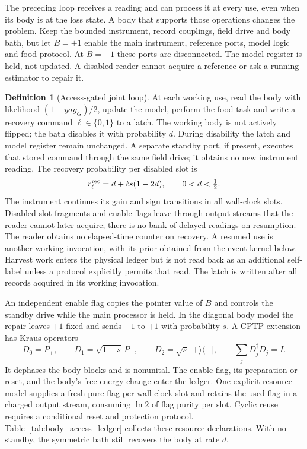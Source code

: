 \documentclass[12pt]{article}
\theoremstyle{definition}
\newtheorem{definition}[theorem]{Definition}
\begin{document}
The preceding loop receives a reading and can process it at every use, even when its body is at the loss state. A body that supports those operations changes the problem. Keep the bounded instrument, record couplings, field drive and body bath, but let $B=+1$ enable the main instrument, reference ports, model logic and food protocol. At $B=-1$ these ports are disconnected. The model register is held, not updated. A disabled reader cannot acquire a reference or ask a running estimator to repair it.

\begin{definition}[Access-gated joint loop]
\label{def:access_joint}
At each working use, read the body with likelihood $(1+y\sigma g_G)/2$, update the model, perform the food task and write a recovery command $\ell\in\{0,1\}$ to a latch. The working body is not actively flipped; the bath disables it with probability $d$. During disability the latch and model register remain unchanged. A separate standby port, if present, executes that stored command through the same field drive; it obtains no new instrument reading. The recovery probability per disabled slot is
\[
 r^{\rm rec}_\ell=d+\ell s(1-2d),\qquad 0<d<\tfrac12.
\]
The instrument continues its gain and sign transitions in all wall-clock slots. Disabled-slot fragments and enable flags leave through output streams that the reader cannot later acquire; there is no bank of delayed readings on resumption. The reader obtains no elapsed-time counter on recovery. A resumed use is another working invocation, with its prior obtained from the event kernel below.
Harvest work enters the physical ledger but is not read back as an additional self-label unless a protocol explicitly permits that read. The latch is written after all records acquired in its working invocation.
\end{definition}

An independent enable flag copies the pointer value of $B$ and controls the standby drive while the main processor is held. In the diagonal body model the repair leaves $+1$ fixed and sends $-1$ to $+1$ with probability $s$. A CPTP extension has Kraus operators
\[
 D_0=P_+,\qquad D_1=\sqrt{1-s}\,P_-,\qquad
 D_2=\sqrt{s}\,\lvert+\rangle\langle-\rvert,
 \qquad \sum_jD_j^\dagger D_j=I.
\]
It dephases the body blocks and is nonunital. The enable flag, its preparation or reset, and the body's free-energy change enter the ledger. One explicit resource model supplies a fresh pure flag per wall-clock slot and retains the used flag in a charged output stream, consuming $\ln2$ of flag purity per slot. Cyclic reuse requires a conditional reset and protection protocol. Table~\ref{tab:body_access_ledger} collects these resource declarations. With no standby, the symmetric bath still recovers the body at rate $d$.
\end{document}
